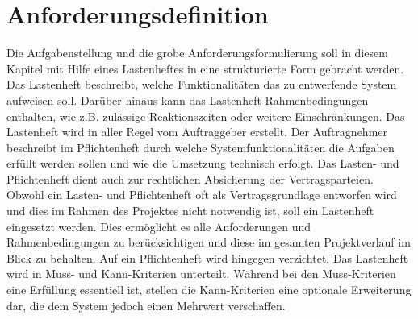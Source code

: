 \documentclass[ a4paper,
                oneside,
                toc=bibliography,
                toc=listof
                ]{scrbook}
\begin{document}
	\chapter{Anforderungsdefinition}
	\label{chap:Anforderungsdefinition}
	Die Aufgabenstellung und die grobe Anforderungsformulierung soll in diesem Kapitel mit Hilfe eines Lastenheftes in eine strukturierte Form gebracht werden. Das Lastenheft beschreibt, welche Funktionalitäten das zu entwerfende System aufweisen soll. Darüber hinaus kann das Lastenheft Rahmenbedingungen enthalten, wie z.B. zulässige Reaktionszeiten oder weitere Einschränkungen. Das Lastenheft wird in aller Regel vom Auftraggeber erstellt. Der Auftragnehmer beschreibt im Pflichtenheft durch welche Systemfunktionalitäten die Aufgaben erfüllt werden sollen und wie die Umsetzung technisch erfolgt. Das Lasten- und Pflichtenheft dient auch zur rechtlichen Absicherung der Vertragsparteien. Obwohl ein Lasten- und Pflichtenheft oft als Vertragsgrundlage entworfen wird und dies im Rahmen des Projektes nicht notwendig ist, soll ein Lastenheft eingesetzt werden. Dies ermöglicht es alle Anforderungen und Rahmenbedingungen zu berücksichtigen und diese im gesamten Projektverlauf im Blick zu behalten. Auf ein Pflichtenheft wird hingegen verzichtet. \cite{SoftwaretechnikBroy}
	Das Lastenheft wird in Muss- und Kann-Kriterien unterteilt. Während bei den Muss-Kriterien eine Erfüllung essentiell ist, stellen die Kann-Kriterien eine optionale Erweiterung dar, die dem System jedoch einen Mehrwert verschaffen.\\
\end{document}
